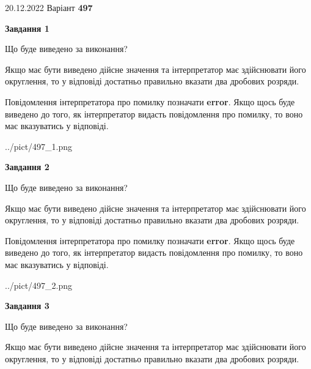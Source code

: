 \documentclass[12pt, ukrainian]{article}
\begin{document}
{20.12.2022 Варіант \No \textbf { 497 }\par}
{
\begin {Large}

{\begin {center}\textbf{Завдання 1}\end {center}}\par
Що буде виведено за виконання? \par

Якщо має бути виведено дійсне значення та інтерпретатор має здійснювати його округлення, 
то у відповіді достатньо правильно вказати два дробових розряди.

Повідомлення інтерпретатора про помилку позначати \textbf{error}.
Якщо щось буде виведено до того, як інтерпретатор видасть повідомлення про помилку, 
то воно має вказуватись у відповіді. \par

\begin{center}
	{../pict/497_1.png}
\end{center}
\newpage

{\begin {center}\textbf{Завдання 2}\end {center}}\par
Що буде виведено за виконання? \par

Якщо має бути виведено дійсне значення та інтерпретатор має здійснювати його округлення, 
то у відповіді достатньо правильно вказати два дробових розряди.

Повідомлення інтерпретатора про помилку позначати \textbf{error}.
Якщо щось буде виведено до того, як інтерпретатор видасть повідомлення про помилку, 
то воно має вказуватись у відповіді. \par

\begin{center}
	{../pict/497_2.png}
\end{center}
\newpage

{\begin {center}\textbf{Завдання 3}\end {center}}\par
Що буде виведено за виконання? \par

Якщо має бути виведено дійсне значення та інтерпретатор має здійснювати його округлення, 
то у відповіді достатньо правильно вказати два дробових розряди.


\end{Large}}
\end{document}
